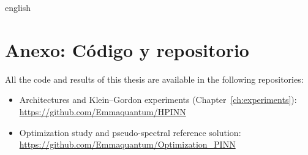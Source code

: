 \documentclass[../0000.tex]{subfiles}
\begin{document}

\begin{hyphenrules}{english}

\chapter{Anexo: Código y repositorio}
All the code and results of this thesis are available in the following repositories:
\begin{itemize}
  \item Architectures and Klein--Gordon experiments (Chapter~\ref{ch:experiments}):
    \url{https://github.com/Emmaquantum/HPINN}
  \item Optimization study and pseudo-spectral reference solution:
    \url{https://github.com/Emmaquantum/Optimization_PINN}
\end{itemize}

\end{hyphenrules}

\ifSubfilesClassLoaded{}{}
\end{document}
